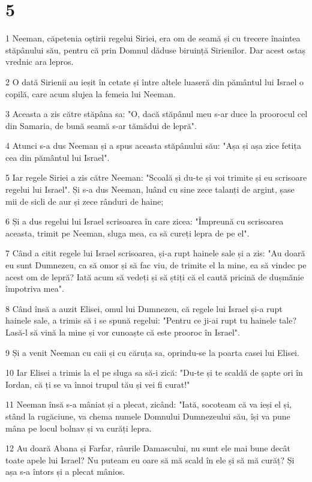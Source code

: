 \chapter{5}

\par 1 Neeman, căpetenia oștirii regelui Siriei, era om de seamă și cu trecere înaintea stăpânului său, pentru că prin Domnul dăduse biruință Sirienilor. Dar acest ostaș vrednic ara lepros.
\par 2 O dată Sirienii au ieșit în cetate și între altele luaseră din pământul lui Israel o copilă, care acum slujea la femeia lui Neeman.
\par 3 Aceasta a zis către stăpâna sa: "O, dacă stăpânul meu s-ar duce la proorocul cel din Samaria, de bună seamă s-ar tămădui de lepră".
\par 4 Atunci s-a dus Neeman și a spus aceasta stăpânului său: "Așa și așa zice fetița cea din pământul lui Israel".
\par 5 Iar regele Siriei a zis către Neeman: "Scoală și du-te și voi trimite și eu scrisoare regelui lui Israel". Și s-a dus Neeman, luând cu sine zece talanți de argint, șase mii de sicli de aur și zece rânduri de haine;
\par 6 Și a dus regelui lui Israel scrisoarea în care zicea: "Împreună cu scrisoarea aceasta, trimit pe Neeman, sluga mea, ca să cureți lepra de pe el".
\par 7 Când a citit regele lui Israel scrisoarea, și-a rupt hainele sale și a zis: "Au doară eu sunt Dumnezeu, ca să omor și să fac viu, de trimite el la mine, ea să vindec pe acest om de lepră? Iată acum să vedeți și să știți că el caută pricină de dușmănie împotriva mea".
\par 8 Când însă a auzit Elisei, omul lui Dumnezeu, că regele lui Israel și-a rupt hainele sale, a trimis să i se spună regelui: "Pentru ce ji-ai rupt tu hainele tale? Lasă-l să vină la mine și vor cunoaște că este prooroc în Israel".
\par 9 Și a venit Neeman cu caii și cu căruța sa, oprindu-se la poarta casei lui Elisei.
\par 10 Iar Elisei a trimis la el pe sluga sa să-i zică: "Du-te și te scaldă de șapte ori în Iordan, că ți se va înnoi trupul tău și vei fi curat!"
\par 11 Neeman însă s-a mâniat și a plecat, zicând: "Iată, socoteam că va ieși el și, stând la rugăciune, va chema numele Domnului Dumnezeului său, își va pune mâna pe locul bolnav și va curăți lepra.
\par 12 Au doară Abana și Farfar, râurile Damascului, nu sunt ele mai bune decât toate apele lui Israel? Nu puteam eu oare să mă scald în ele și să mă curăț? Și așa s-a întors și a plecat mânios.
